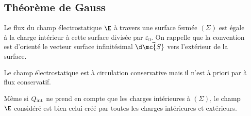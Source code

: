 \documentclass[12pt,fancy]{/Users/victor/Documents/COURS/2ACapECL/texmf/tex/latex/Preambles/cours}
\begin{document}
\subsection{Théorème de Gauss}

\begin{theorem}

Le flux du champ électrostatique $\E$ à travers une surface fermée $(\Sigma)$ est égale à la charge intérieur à cette surface divisée par $\varepsilon_{0}$.
On rappelle que la convention est d'orienté le vecteur surface infinitésimal $\d \Vec{\mc{S}}$ vers l'extérieur de la surface.
\end{theorem}

\begin{remarque}
\begin{liste}
\item Le champ électrostatique est à circulation conservative mais il n'est à priori par à flux conservatif.
\item Même si $Q_{\rm{int}}$ ne prend en compte que les charges intérieures à $(\Sigma)$, le champ $\E$ considéré est bien celui créé par toutes les charges intérieures et extérieurs.
\end{liste}
\end{remarque}
\end{document}
